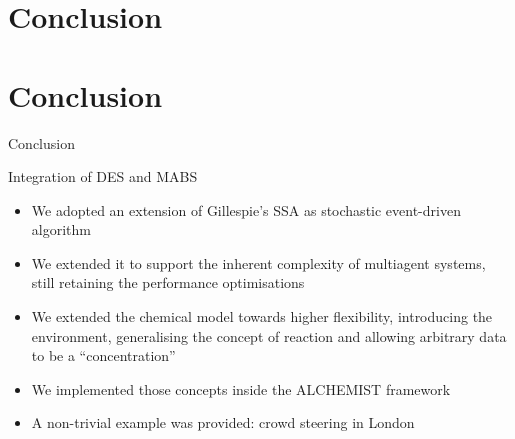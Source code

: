 \documentclass[presentation]{beamer} %
\newcommand{\alchemist}{{\sf ALCHEMIST}}
\begin{document}
\section*{Conclusion}


\section{Conclusion}
\begin{frame}{Conclusion}
  \begin{block}{Integration of DES and MABS}
    \begin{itemize}
      \item We adopted an extension of Gillespie's SSA as stochastic event-driven algorithm
      \item We extended it to support the inherent complexity of multiagent systems, still retaining the performance optimisations
      \item We extended the chemical model towards higher flexibility, introducing the environment, generalising the concept of reaction and allowing arbitrary data to be a ``concentration''
      \item We implemented those concepts inside the \alchemist{} framework
      \item A non-trivial example was provided: crowd steering in London
    \end{itemize}
  \end{block}
\end{frame}



\section*{\refname}
\begin{frame}[allowframebreaks]
  \frametitle{\refname}
  \scriptsize
  
  
\end{frame}
\section*{\refname}
\end{document}
